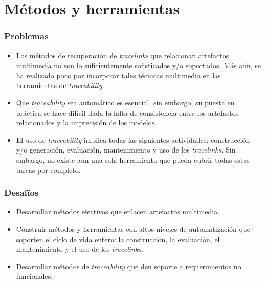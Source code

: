 \documentclass[a4paper,12pt,twoside,spanish,openright]{book}
\begin{document}
\section{Métodos y herramientas}

\subsubsection{Problemas}

\begin{itemize}[label={$\times$}]

\item Los métodos de recuperación de \textit{tracelinks} que relacionan artefactos multimedia no son lo suficientemente sofisticados y/o soportados. Más aún, se ha realizado poco por incorporar tales técnicas multimedia en las herramientas de \textit{traceability}.

\item Que \textit{traceability} sea automático es esencial, sin embargo, su puesta en práctica se hace difícil dada la falta de consistencia entre los artefactos relacionados y la imprecisión de los modelos.

\item El uso de \textit{traceability} implica todas las siguientes actividades: construcción y/o generación, evaluación, mantenimiento y uso de los \textit{tracelinks}. Sin embargo, no existe aún una sola herramienta que pueda cubrir todas estas tareas por completo.

\end{itemize}

\subsubsection{Desafíos}

\begin{itemize}[label={\checkmark}]

\item Desarrollar métodos efectivos que enlacen artefactos multimedia.

\item Construir métodos y herramientas con altos niveles de automatización que soporten el ciclo de vida entero: la construcción, la evaluación, el mantenimiento y el uso de los \textit{tracelinks}.

\item Desarrollar métodos de \textit{traceability} que den soporte a requerimientos no funcionales.

\end{itemize}
\end{document}
